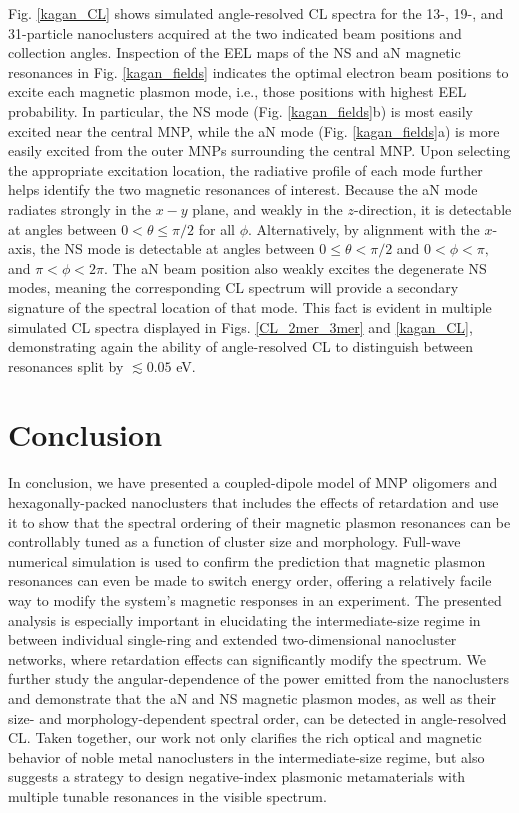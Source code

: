 \documentclass [11pt, proquest] {uwthesis}[2016/11/22]
\begin{document}
Fig. \ref{kagan_CL} shows simulated angle-resolved CL spectra for the 13-, 19-, and 31-particle nanoclusters acquired at the two indicated beam positions and collection angles. Inspection of the EEL maps of the NS and aN magnetic resonances in Fig. \ref{kagan_fields} indicates the optimal electron beam positions to excite each magnetic plasmon mode, i.e., those positions with highest EEL probability. In particular, the NS mode (Fig. \ref{kagan_fields}b) is most easily excited near the central MNP, while the aN mode (Fig. \ref{kagan_fields}a) is more easily excited from the outer MNPs surrounding the central MNP. Upon selecting the appropriate excitation location, the radiative profile of each mode further helps identify the two magnetic resonances of interest. Because the aN mode radiates strongly in the $x-y$ plane, and weakly in the $z$-direction, it is detectable at angles between $0 < \theta \leq \pi/2$ for all $\phi$. Alternatively, by alignment with the $x$-axis, the NS mode is detectable at angles between $0 \leq \theta < \pi/2$ and $0<\phi<\pi,$ and $\pi<\phi<2\pi.$ The aN beam position also weakly excites the degenerate NS modes, meaning the corresponding CL spectrum will provide a secondary signature of the spectral location of that mode. This fact is evident in multiple simulated CL spectra displayed in Figs. \ref{CL_2mer_3mer} and \ref{kagan_CL}, demonstrating again the ability of angle-resolved CL to distinguish between resonances split by $\lesssim0.05$ eV.




\section{Conclusion}
In conclusion, we have presented a coupled-dipole model of MNP oligomers and hexagonally-packed nanoclusters that includes the effects of retardation and use it to show that the spectral ordering of their magnetic plasmon resonances can be controllably tuned as a function of cluster size and morphology. Full-wave numerical simulation is used to confirm the prediction that magnetic plasmon resonances can even be made to switch energy order, offering a relatively facile way to modify the system's magnetic responses in an experiment. The presented analysis is especially important in elucidating the intermediate-size regime in between individual single-ring and extended two-dimensional nanocluster networks, where retardation effects can significantly modify the spectrum. We further study the angular-dependence of the power emitted from the nanoclusters and demonstrate that the aN and NS magnetic plasmon modes, as well as their size- and morphology-dependent spectral order, can be detected in angle-resolved CL. Taken together, our work not only clarifies the rich optical and magnetic behavior of noble metal nanoclusters in the intermediate-size regime, but also suggests a strategy to design negative-index plasmonic metamaterials with multiple tunable resonances in the visible spectrum.
\end{document}
